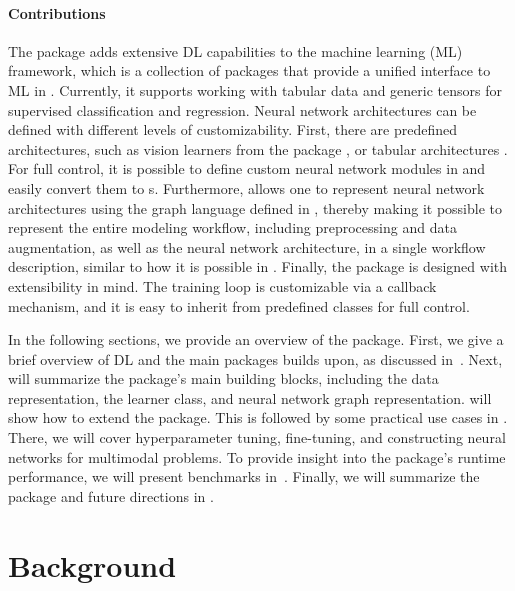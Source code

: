 \documentclass[article]{jss}
\theoremstyle{definition}
\begin{document}
\paragraph{Contributions} The  package adds extensive DL capabilities to the \mlrt{} machine learning (ML) framework, which is a collection of \rlang{} packages that provide a unified interface to ML in \rlang{}.
Currently, it supports working with tabular data and generic tensors for supervised classification and regression.
Neural network architectures can be defined with different levels of customizability.
First, there are predefined architectures, such as vision learners from the  \rlang{} package \citep{ref-r-torchvision}, or tabular architectures \citep{gorishniy2021revisiting}.
For full control, it is possible to define custom neural network modules in \rlang{} \torch{} and easily convert them to \mlrt{} s.
Furthermore, \mlrttorch{} allows one to represent neural network architectures using the graph language defined in \mlrtpipelines{}, thereby making it possible to represent the entire modeling workflow, including preprocessing and data augmentation, as well as the neural network architecture, in a single workflow description, similar to how it is possible in \keras{} \citep{ref-chollet2018keras}.
Finally, the package is designed with extensibility in mind. The training loop is customizable via a callback mechanism, and it is easy to inherit from predefined classes for full control.

In the following sections, we provide an overview of the package. First, we give a brief overview of DL and the main \rlang{} packages \mlrttorch{} builds upon, as discussed in~.
Next,  will summarize the package's main building blocks, including the data representation, the learner class, and neural network graph representation.
 will show how to extend the package. This is followed by some practical use cases in .
There, we will cover hyperparameter tuning, fine-tuning, and constructing neural networks for multimodal problems.
To provide insight into the package's runtime performance, we will present benchmarks in~.
Finally, we will summarize the package and future directions in .

\section{Background}\label{sec:background}
\end{document}
